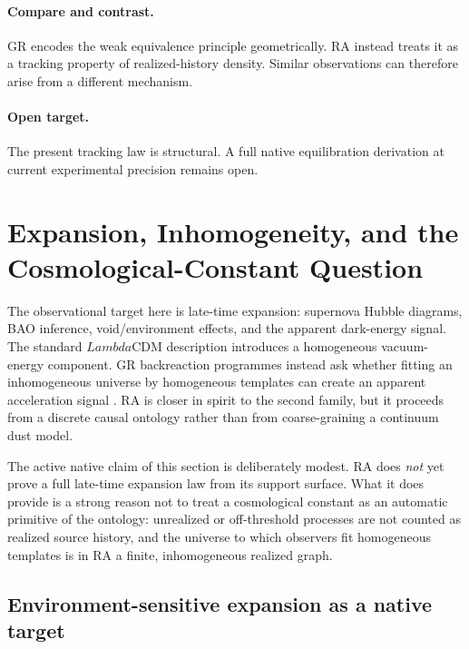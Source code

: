 \documentclass[11pt]{article}
\def\Lambda{Lambda}%
\begin{document}
\paragraph{Compare and contrast.} GR encodes the weak equivalence principle geometrically. RA instead treats it as a tracking property of realized-history density. Similar observations can therefore arise from a different mechanism.

\paragraph{Open target.} The present tracking law is structural. A full native equilibration derivation at current experimental precision remains open.

\section{Expansion, Inhomogeneity, and the Cosmological-Constant Question}
\label{sec:expansion}

The observational target here is late-time expansion: supernova Hubble diagrams, BAO inference, void/environment effects, and the apparent dark-energy signal. The standard $\Lambda$CDM description introduces a homogeneous vacuum-energy component. GR backreaction programmes instead ask whether fitting an inhomogeneous universe by homogeneous templates can create an apparent acceleration signal \cite{Buchert2000,Wiltshire2007,Rasanen2004}. RA is closer in spirit to the second family, but it proceeds from a discrete causal ontology rather than from coarse-graining a continuum dust model.

The active native claim of this section is deliberately modest. RA does \emph{not} yet prove a full late-time expansion law from its support surface. What it does provide is a strong reason not to treat a cosmological constant as an automatic primitive of the ontology: unrealized or off-threshold processes are not counted as realized source history, and the universe to which observers fit homogeneous templates is in RA a finite, inhomogeneous realized graph.

\subsection{Environment-sensitive expansion as a native target}
\end{document}
